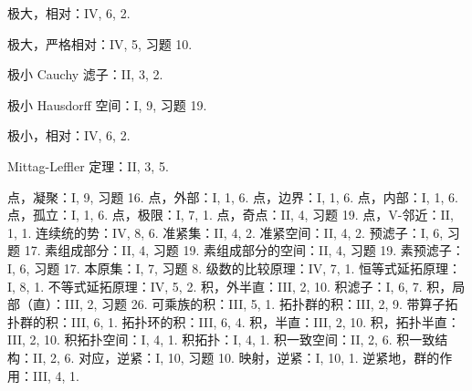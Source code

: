 极大，相对：IV, 6, 2.

极大，严格相对：IV, 5, 习题 10.

极小 Cauchy 滤子：II, 3, 2.

极小 Hausdorff 空间：I, 9, 习题 19.

极小，相对：IV, 6, 2.

Mittag-Leffler 定理：II, 3, 5.

\begin{Shaded}
\begin{Highlighting}[]



\end{Highlighting}
\end{Shaded}

点，凝聚：I, 9, 习题 16. 点，外部：I, 1, 6. 点，边界：I, 1, 6. 点，内部：I, 1, 6. 点，孤立：I, 1, 6. 点，极限：I, 7, 1. 点，奇点：II, 4, 习题 19. 点，V-邻近：II, 1, 1. 连续统的势：IV, 8, 6. 准紧集：II, 4, 2. 准紧空间：II, 4, 2. 预滤子：I, 6, 习题 17. 素组成部分：II, 4, 习题 19. 素组成部分的空间：II, 4, 习题 19. 素预滤子：I, 6, 习题 17. 本原集：I, 7, 习题 8. 级数的比较原理：IV, 7, 1. 恒等式延拓原理：I, 8, 1. 不等式延拓原理：IV, 5, 2. 积，外半直：III, 2, 10. 积滤子：I, 6, 7. 积，局部（直）：III, 2, 习题 26. 可乘族的积：III, 5, 1. 拓扑群的积：III, 2, 9. 带算子拓扑群的积：III, 6, 1. 拓扑环的积：III, 6, 4. 积，半直：III, 2, 10. 积，拓扑半直：III, 2, 10. 积拓扑空间：I, 4, 1. 积拓扑：I, 4, 1. 积一致空间：II, 2, 6. 积一致结构：II, 2, 6. 对应，逆紧：I, 10, 习题 10. 映射，逆紧：I, 10, 1. 逆紧地，群的作用：III, 4, 1.

